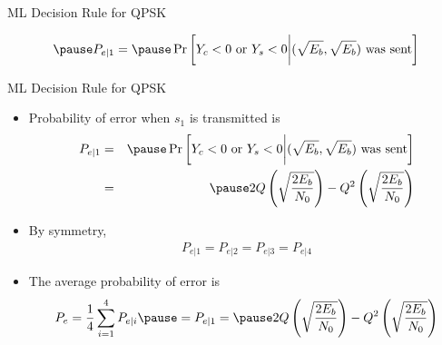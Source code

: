 \documentclass[t]{beamer}
\begin{document}
\begin{frame}{ML Decision Rule for QPSK}
  \footnotesize
  \begin{figure}
    \centering
  \end{figure}
  \begin{eqnarray*}
    \pause P_{e|1}  =  \pause \Pr\left[ Y_c < 0 \text{ or } Y_s < 0 \bigg| (\sqrt{E_b}, \sqrt{E_b}) \text{ was sent} \right] 
  \end{eqnarray*}
  \normalsize
\end{frame}

\begin{frame}{ML Decision Rule for QPSK}
  \footnotesize
  \begin{itemize}
    \item \pause Probability of error when $s_1$ is transmitted is
      \begin{eqnarray*}
        P_{e|1} & = & \pause \Pr\left[ Y_c < 0 \text{ or } Y_s < 0 \bigg| (\sqrt{E_b}, \sqrt{E_b}) \text{ was sent} \right] \\
                & = & \pause 2Q\left(\sqrt{\frac{2E_b}{N_0} }\right) -Q^2\left(\sqrt{\frac{2E_b}{N_0} }\right) 
      \end{eqnarray*}
    \item \pause By symmetry, 
      \begin{eqnarray*}
        P_{e|1} = P_{e|2} = P_{e|3} = P_{e|4}
      \end{eqnarray*}
    \item \pause The average probability of error is
      \begin{eqnarray*}
        P_{e} = \frac{1}{4} \sum_{i=1}^4 P_{e|i} \pause = P_{e|1} =  \pause 2Q\left(\sqrt{\frac{2E_b}{N_0} }\right) -Q^2\left(\sqrt{\frac{2E_b}{N_0} }\right) 
      \end{eqnarray*}
  \end{itemize}
  \normalsize
\end{frame}
\end{document}
